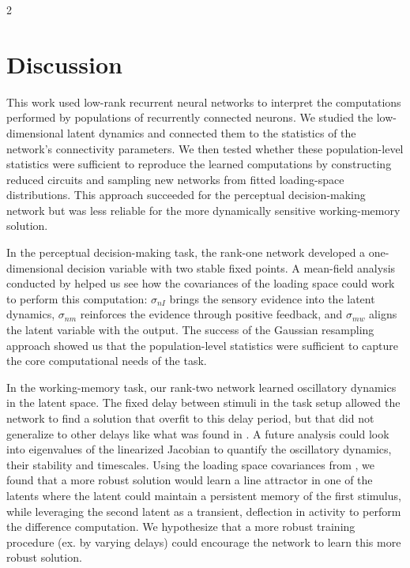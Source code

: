 \documentclass[10pt]{article}
\begin{document}
\begin{multicols}{2}

\section{Discussion}

This work used low-rank recurrent neural networks to interpret the computations performed by populations of recurrently connected neurons. We studied the low-dimensional latent dynamics and connected them to the statistics of the network's connectivity parameters. We then tested whether these population-level statistics were sufficient to reproduce the learned computations by constructing reduced circuits and sampling new networks from fitted loading-space distributions. This approach succeeded for the perceptual decision-making network but was less reliable for the more dynamically sensitive working-memory solution.

In the perceptual decision-making task, the rank-one network developed a one-dimensional decision variable with two stable fixed points. A mean-field analysis conducted by \citet{dubreuil2022} helped us see how the covariances of the loading space could work to perform this computation: $\sigma_{nI}$ brings the sensory evidence into the latent dynamics, $\sigma_{nm}$ reinforces the evidence through positive feedback, and $\sigma_{mw}$ aligns the latent variable with the output. The success of the Gaussian resampling approach showed us that the population-level statistics were sufficient to capture the core computational needs of the task.

In the working-memory task, our rank-two network learned oscillatory dynamics in the latent space. The fixed delay between stimuli in the task setup allowed the network to find a solution that overfit to this delay period, but that did not generalize to other delays like what was found in \citet{dubreuil2022}. A future analysis could look into eigenvalues of the linearized Jacobian to quantify the oscillatory dynamics, their stability and timescales. Using the loading space covariances from \citet{dubreuil2022}, we found that a more robust solution would learn a line attractor in one of the latents where the latent could maintain a persistent memory of the first stimulus, while leveraging the second latent as a transient, deflection in activity to perform the difference computation. We hypothesize that a more robust training procedure (ex. by varying delays) could encourage the network to learn this more robust solution.


\end{multicols}
\end{document}
